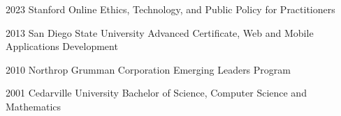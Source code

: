 \education
  {2023}
  {Stanford Online}
  {Ethics, Technology, and Public Policy for Practitioners}

\education
  {2013}
  {San Diego State University}
  {Advanced Certificate, Web and Mobile Applications Development}

\education
  {2010}
  {Northrop Grumman Corporation}
  {Emerging Leaders Program}

\education
  {2001}
  {Cedarville University}
  {Bachelor of Science, Computer Science and Mathematics}
